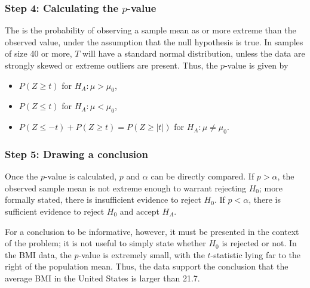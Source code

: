 \begin{spacing}{1.5}
\subsubsection{Step 4: Calculating the $p$-value}

The  is the probability of observing a sample mean as or more extreme than the observed value, under the assumption that the null hypothesis is true. In samples of size 40 or more, $T$ will have a standard normal distribution, unless the data are strongly skewed or extreme outliers are present. Thus, the $p$-value is given by

\begin{itemize}
	\item $P(Z \geq t)$ for $H_A: \mu > \mu_0$,
	
	\item $P(Z \leq t)$ for $H_A: \mu < \mu_0$,
	
	\item $P(Z \leq -t) + P(Z \geq t) = P(Z \geq |t| )$ for $H_A: \mu \neq \mu_0.$
\end{itemize}

\subsubsection{Step 5: Drawing a conclusion}

Once the $p$-value is calculated, $p$ and $\alpha$ can be directly compared. If $p > \alpha$, the observed sample mean is not extreme enough to warrant rejecting $H_0$; more formally stated, there is insufficient evidence to reject $H_0$. If $p < \alpha$, there is sufficient evidence to reject $H_0$ and accept $H_A$. 

For a conclusion to be informative, however, it must be presented in the context of the problem; it is not useful to simply state whether $H_0$ is rejected or not. In the  BMI data, the $p$-value is extremely small, with the $t$-statistic lying far to the right of the population mean. Thus, the data support the conclusion that the average BMI in the United States is larger than 21.7. 



\end{spacing}
